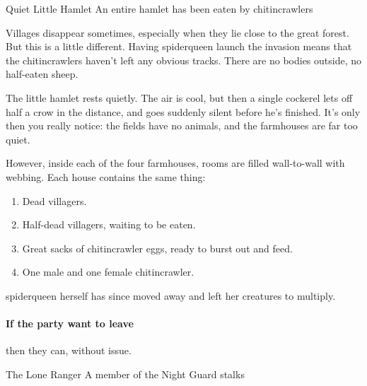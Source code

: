 \begin{multicols}{2}
{Quiet Little Hamlet}%
{An entire hamlet has been eaten by chitincrawlers}%

\begin{figure*}[t]

	\label{ruined_village_map}\label{ruined_village_map}

\end{figure*}

Villages disappear sometimes, especially when they lie close to the great forest.  But this is a little different.  Having \gls{spiderqueen} launch the invasion means that the chitincrawlers haven't left any obvious tracks.  There are no bodies outside, no half-eaten sheep.

\begin{boxtext}

	The little hamlet rests quietly.
	The air is cool, but then a single cockerel lets off half a crow in the distance, and goes suddenly silent before he's finished.
	It's only then you really notice: the fields have no animals, and the farmhouses are far too quiet.

\end{boxtext}

However, inside each of the four farmhouses, rooms are filled wall-to-wall with webbing.  Each house contains the same thing:

\begin{enumerate}

	\item{Dead villagers.}
	\item{Half-dead villagers, waiting to be eaten.}
	\item{Great sacks of chitincrawler eggs, ready to burst out and feed.}
	\item{One male and one female chitincrawler.}
\end{enumerate}

\Gls{spiderqueen} herself has since moved away and left her creatures to multiply.

\paragraph{If the party want to leave}
then they can, without issue.



{The Lone Ranger}%
{A member of the Night Guard stalks }%


\end{multicols}
